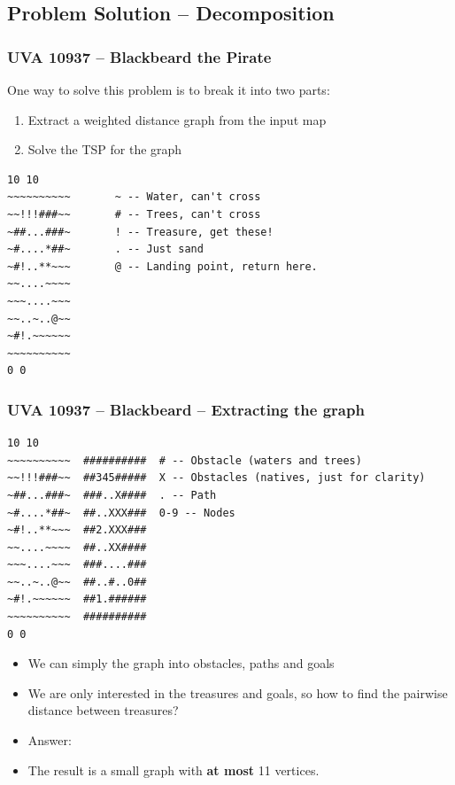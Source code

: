 \subsection{Problem Solution -- Decomposition}
\begin{frame}[fragile]
  \frametitle{UVA 10937 -- Blackbeard the Pirate}

    \begin{block}{One way to solve this problem is to break it into two parts:}
      \begin{enumerate}
      \item Extract a weighted distance graph from the input map
      \item Solve the TSP for the graph
      \end{enumerate}
    \end{block}

    {\smaller
\begin{verbatim}
10 10
~~~~~~~~~~       ~ -- Water, can't cross
~~!!!###~~       # -- Trees, can't cross
~##...###~       ! -- Treasure, get these!
~#....*##~       . -- Just sand
~#!..**~~~       @ -- Landing point, return here.
~~....~~~~
~~~....~~~
~~..~..@~~
~#!.~~~~~~
~~~~~~~~~~
0 0
\end{verbatim}
  }
\end{frame}

\begin{frame}[fragile]
  \frametitle{UVA 10937 -- Blackbeard -- Extracting the graph}

  {\smaller
\begin{verbatim}
10 10
~~~~~~~~~~  ##########  # -- Obstacle (waters and trees)
~~!!!###~~  ##345#####  X -- Obstacles (natives, just for clarity)
~##...###~  ###..X####  . -- Path
~#....*##~  ##..XXX###  0-9 -- Nodes
~#!..**~~~  ##2.XXX###
~~....~~~~  ##..XX####
~~~....~~~  ###....###
~~..~..@~~  ##..#..0##
~#!.~~~~~~  ##1.######
~~~~~~~~~~  ##########
0 0
\end{verbatim}

\begin{itemize}
\item We can simply the graph into obstacles, paths and goals
\item We are only interested in the treasures and goals, so how to find the
  pairwise distance between treasures?
\item \alert{Answer}: 
\item The result is a small graph with {\bf at most} 11 vertices.
\end{itemize}

  }
\end{frame}

